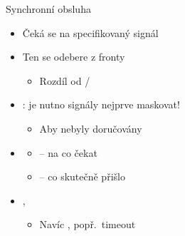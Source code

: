 \begin{frame}{Synchronní obsluha}

  \begin{itemize}
    \item Čeká se na specifikovaný signál

    \pause

    \item Ten se odebere z fronty
    \begin{itemize}
      \item Rozdíl od /
    \end{itemize}

    \pause

    \item \pozor: je nutno signály nejprve maskovat!
    \begin{itemize}
      \item Aby nebyly doručovány
    \end{itemize}

    \pause

    \item {}
    \begin{itemize}
      \item {} -- na co čekat
      \item {} -- co skutečně přišlo
    \end{itemize}

    \pause

    \item {}, 
    \begin{itemize}
      \item Navíc , popř.\ timeout
    \end{itemize}
  \end{itemize}

\end{frame}

